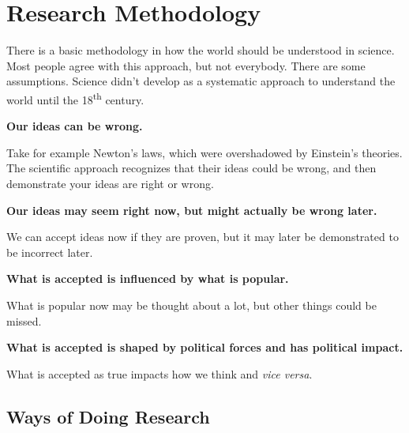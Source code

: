 \documentclass[12pt]{article}
\begin{document}
\section*{Research Methodology}

There is a basic methodology in how the world should be understood in science.
Most people agree with this approach, but not everybody. There are some
assumptions.
Science didn't develop as a systematic approach to understand the world until
the 18\textsuperscript{th} century.

\textbf{Our ideas can be wrong.}

Take for example Newton's laws, which were overshadowed by Einstein's theories.
The scientific approach recognizes that their ideas could be wrong, and then
demonstrate your ideas are right or wrong.

\textbf{Our ideas may seem right now, but might actually be wrong later.}

We can accept ideas now if they are proven, but it may later be demonstrated to
be incorrect later.

\textbf{What is accepted is influenced by what is popular.}

What is popular now may be thought about a lot, but other things could be
missed.

\textbf{What is accepted is shaped by political forces and has political
impact.}

What is accepted as true impacts how we think and \textit{vice versa}.

\subsection*{Ways of Doing Research}
\end{document}
